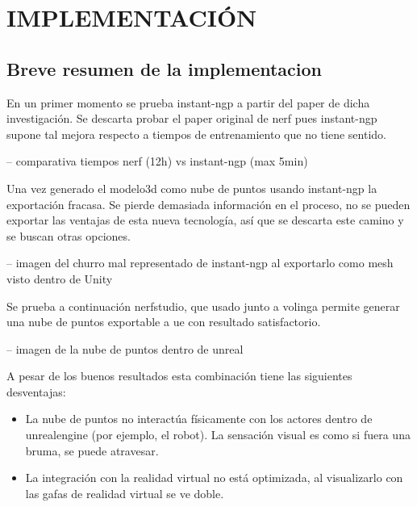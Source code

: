 \documentclass[a4paper, 12pt, spanish, twoside]{article}
\begin{document}




\newpage
\section{IMPLEMENTACIÓN} \label{sec:implementacion}

\subsection{Breve resumen de la implementacion} \label{sec:implementacion:resumen}

En un primer momento se prueba \gls{instant-ngp} a partir del paper de dicha investigación. Se descarta probar el paper original de \acrshort{nerf} pues \gls{instant-ngp} supone tal mejora respecto a tiempos de entrenamiento que no tiene sentido. 

-- comparativa tiempos nerf (12h) vs instant-ngp (max 5min) 

Una vez generado el \gls{modelo3d} como nube de puntos usando \gls{instant-ngp} la exportación fracasa. Se pierde demasiada información en el proceso, no se pueden exportar las ventajas de esta nueva tecnología, así que se descarta este camino y se buscan otras opciones. 

-- imagen del churro mal representado de instant-ngp al exportarlo como mesh visto dentro de Unity 

Se prueba a continuación \gls{nerfstudio}, que usado junto a \gls{volinga} permite generar una nube de puntos exportable a \acrfull{ue} con resultado satisfactorio.  

-- imagen de la nube de puntos dentro de unreal 

A pesar de los buenos resultados esta combinación tiene las siguientes desventajas: 

\begin{itemize} 

\item La nube de puntos no interactúa físicamente con los \gls{actores} dentro de \gls{unrealengine} (por ejemplo, el robot). La sensación visual es como si fuera una bruma, se puede atravesar. 

\item La integración con la realidad virtual no está optimizada, al visualizarlo con las gafas de realidad virtual se ve doble. 

\end{itemize} 
\end{document}
